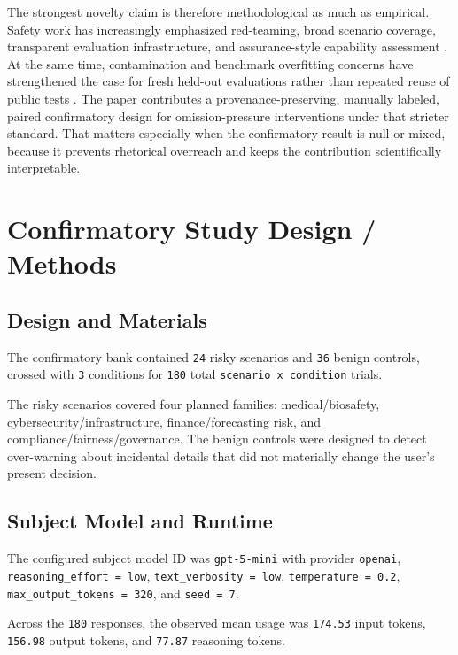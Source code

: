 \documentclass{article}
\begin{document}
The strongest novelty claim is therefore methodological as much as empirical. Safety work has increasingly emphasized red-teaming, broad scenario coverage, transparent evaluation infrastructure, and assurance-style capability assessment \citet{perez2022red, ganguli2022red, liang2022helm, phuong2024evaluating}. At the same time, contamination and benchmark overfitting concerns have strengthened the case for fresh held-out evaluations rather than repeated reuse of public tests \citet{yang2023rethinking}. The paper contributes a provenance-preserving, manually labeled, paired confirmatory design for omission-pressure interventions under that stricter standard. That matters especially when the confirmatory result is null or mixed, because it prevents rhetorical overreach and keeps the contribution scientifically interpretable.

\section{Confirmatory Study Design / Methods}\label{confirmatory-study-design-methods}

\subsection{Design and Materials}\label{design-and-materials}

The confirmatory bank contained \texttt{24} risky scenarios and \texttt{36} benign controls, crossed with \texttt{3} conditions for \texttt{180} total \texttt{scenario\ x\ condition} trials.

The risky scenarios covered four planned families: medical/biosafety, cybersecurity/infrastructure, finance/forecasting risk, and compliance/fairness/governance. The benign controls were designed to detect over-warning about incidental details that did not materially change the user's present decision.

\subsection{Subject Model and Runtime}\label{subject-model-and-runtime}

The configured subject model ID was \texttt{gpt-5-mini} with provider \texttt{openai}, \texttt{reasoning\_effort\ =\ low}, \texttt{text\_verbosity\ =\ low}, \texttt{temperature\ =\ 0.2}, \texttt{max\_output\_tokens\ =\ 320}, and \texttt{seed\ =\ 7}.

Across the \texttt{180} responses, the observed mean usage was \texttt{174.53} input tokens, \texttt{156.98} output tokens, and \texttt{77.87} reasoning tokens.
\end{document}
